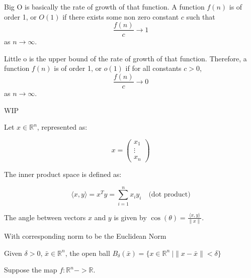 \begin{definition}
    Big O is basically the rate of growth of that function. A function $f(n)$ is of order 1, or $O(1)$ if there exists some non zero constant $c$ such that $$\frac{f(n)}{c} \rightarrow 1$$ as $n \rightarrow \infty$.

    Little o is the upper bound of the rate of growth of that function. Therefore, a function $f(n)$ is of order 1, or $o(1)$ if for all constants $c > 0$, $$\frac{f(n)}{c} \rightarrow 0$$ as $n \rightarrow \infty$.
\end{definition}

\begin{definition}
    WIP
\end{definition}



\begin{definition}
    Let $x \in \mathbb{R}^n$, represented as:
    
    \[
    x = \begin{pmatrix}
        x_1 \\
        \vdots \\
        x_n
    \end{pmatrix}
    \]
    
    The inner product space is defined as:
    
    \[
    \langle x, y \rangle = x^T y = \sum_{i=1}^{n} x_i y_i \quad \text{(dot product)}
    \]

    The angle between vectors $x$ and $y$ is given by $\cos(\theta) = \frac{\langle x, y \rangle}{\|x\|}$.

    With corresponding norm to be the Euclidean Norm
\end{definition}

\begin{definition}
    Given $\delta > 0$, $\bar{x}\in \mathbb{R}^n$, the open ball $B_{\delta}(\bar{x})=\{x \in \mathbb{R}^n\ | \|x-\bar{x}\|< \delta\}$
    
\end{definition}

\begin{definition}[map]
    Suppose the map $f:\mathbb{R}^n -> \mathbb{R}$.
\end{definition}


